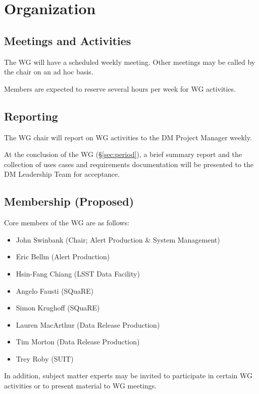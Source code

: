 \documentclass[DM,toc]{lsstdoc}
\begin{document}
\section{Organization}

\subsection{Meetings and Activities}

The WG will have a scheduled weekly meeting. Other meetings may be called by
the chair on an ad hoc basis.

Members are expected to reserve several hours per week for WG activities.

\subsection{Reporting}

The WG chair will report on WG activities to the DM Project Manager weekly.

At the conclusion of the WG (\S\ref{sec:period}), a brief summary report and
the collection of uses cases and requirements documentation will be presented
to the DM Leadership Team for acceptance.

\subsection{Membership (Proposed)}
\label{sec:members}

Core members of the WG are as follows:

\begin{itemize}

  \item{John Swinbank (Chair; Alert Production \& System Management)}
  \item{Eric Bellm (Alert Production)}
  \item{Hsin-Fang Chiang (LSST Data Facility)}
  \item{Angelo Fausti (SQuaRE)}
  \item{Simon Krughoff (SQuaRE)}
  \item{Lauren MacArthur (Data Release Production)}
  \item{Tim Morton (Data Release Production)}
  \item{Trey Roby (SUIT)}

\end{itemize}

In addition, subject matter experts may be invited to participate in certain
WG activities or to present material to WG meetings.


\end{document}
